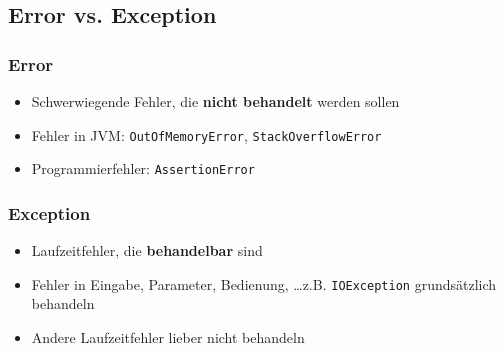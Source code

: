 \subsection{Error vs. Exception}
\vspace{-.9\abovedisplayskip}
\begin{minipage}[t]{0.5\columnwidth}
    \subsubsection{Error}
    \raggedright%
    \begin{itemize}
        \item Schwerwiegende Fehler, die \textbf{nicht behandelt} werden sollen
        \item Fehler in JVM: \lstinline{OutOfMemoryError}, \lstinline{StackOverflowError}
        \item Programmierfehler: \lstinline{AssertionError}
    \end{itemize}
\end{minipage}\hfill%
\begin{minipage}[t]{0.49\columnwidth}
    \subsubsection{Exception}
    \raggedright%
    \begin{itemize}
        \item Laufzeitfehler, die \textbf{behandelbar} sind
        \item Fehler in Eingabe, Parameter, Bedienung, \ldots z.B. \lstinline{IOException} \textrightarrow{} grundsätzlich behandeln
        \item Andere Laufzeitfehler \textrightarrow{} lieber nicht behandeln
    \end{itemize}
\end{minipage}
    
